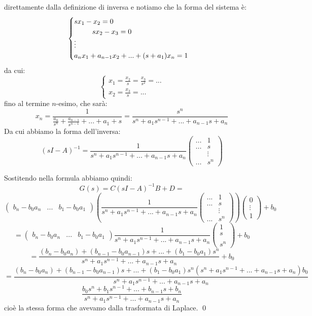 \documentclass[a4paper,11pt]{article}
\begin{document}
direttamente dalla definizione di inversa e notiamo che la forma del sistema è:
\[
	\begin{cases}
		s x_1 - x_2 = 0 \\ 
		\hspace{.9cm} sx_2 - x_3 = 0 \\
		\vdots \\
		a_n x_1 + a_{n - 1} x_2 + ... + (s + a_1) x_n = 1
	\end{cases}
\]
da cui:
\[
	\begin{cases}
		x_1 = \frac{x_2}{s} = \frac{x_3}{s^2} = ... \\ 
		x_2 = \frac{x_3}{s} = ...
	\end{cases}
\]
fino al termine $n$-esimo, che sarà:
$$
x_n = \frac{1}{\frac{a_n}{s^n} + \frac{a_{n - 1}}{s^{n - 1}} + ... + a_1 + s} = \frac{s^{n}}{s^n + a_1 s^{n - 1} + ... + a_{n - 1} s + a_n}
$$
Da cui abbiamo la forma dell'inversa:
$$
(sI - A)^{-1} = 
\frac{1}{s^n + a_1 s^{n - 1} + ... + a_{n - 1} s + a_n}
\begin{pmatrix}
	... & 1 \\ 
	... & s \\
	& \vdots \\ 
	... & s^n
\end{pmatrix}
$$

Sostitendo nella formula abbiamo quindi:
$$
G(s) = C(sI - A)^{-1} B + D = 
$$
$$
\begin{pmatrix}
	b_n - b_0 a_n & ... & b_1 - b_0 a_1	
\end{pmatrix} 
\left(
\frac{1}{s^n + a_1 s^{n - 1} + ... + a_{n - 1} s + a_n}
\begin{pmatrix}
	... & 1 \\ 
	... & s \\
	& \vdots \\ 
	... & s^n
\end{pmatrix}
\right)
\begin{pmatrix}
	0 \\ \vdots \\ 1
\end{pmatrix}
+ b_0
$$
$$
= \begin{pmatrix}
	b_n - b_0 a_n & ... & b_1 - b_0 a_1	
\end{pmatrix} 
\frac{1}{s^n + a_1 s^{n - 1} + ... + a_{n - 1} s + a_n}
\begin{pmatrix}
	 1 \\ 
	 s \\
	 \\ 
	 s^n
\end{pmatrix}
+ b_0
$$
$$
= \frac{ (b_n - b_0 a_n) + (b_{n - 1} - b_0 a_{n - 1}) s + ... + (b_1 - b_0 a_1)s^n }{ s^n + a_1 s^{n - 1} + ... + a_{n - 1} s + a_n} + b_0
$$
$$
= \frac{ (b_n - b_0 a_n) + (b_{n - 1} - b_0 a_{n - 1}) s + ... + (b_1 - b_0 a_1)s^n (s^n + a_1 s^{n - 1} + ... + a_{n - 1} s + a_n) b_0}{ s^n + a_1 s^{n - 1} + ... + a_{n - 1} s + a_n}
$$
$$
\frac{ b_0 s^n + b_1 s^{n - 1} + ... + b_{n - 1} s + b_n}{s^n + a_1 s^{n - 1} + ... + a_{n - 1} s + a_n }
$$
cioè la stessa forma che avevamo dalla trasformata di Laplace. \qed
\end{document}
